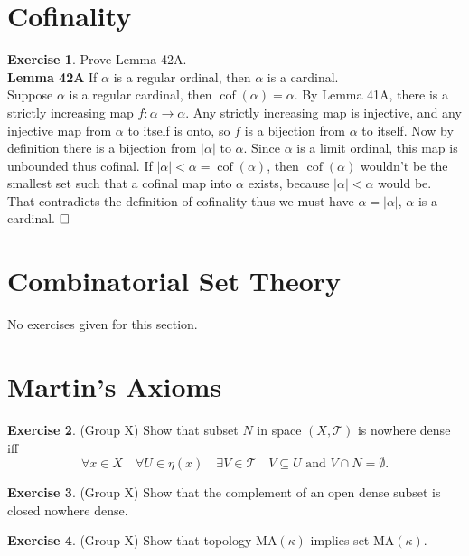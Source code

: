 \documentclass{article}
\theoremstyle{definition}
\newtheorem{exercise}{Exercise}[section]
\newcommand{\so}{\text{\textbf{Solution: }}}
\newcommand{\es}{$\hfill \square$}
\begin{document}
\section{Cofinality}
    \begin{exercise}
        Prove Lemma 42A.\vspace{1em}\\
        \textbf{Lemma 42A} If $\alpha$ is a regular ordinal, then $\alpha$ is a cardinal.\vspace{1em}\\
        \so Suppose $\alpha$ is a regular cardinal, then $\operatorname{cof}(\alpha) = \alpha$. By Lemma 41A, there is a strictly increasing map $f: \alpha \rightarrow \alpha$. Any strictly increasing map is injective, and any injective map from $\alpha$ to itself is onto, so $f$ is a bijection from $\alpha$ to itself. Now by definition there is a bijection from $|\alpha|$ to $\alpha$. Since $\alpha$ is a limit ordinal, this map is unbounded thus cofinal. If $|\alpha| < \alpha = \operatorname{cof}(\alpha)$, then $\operatorname{cof}(\alpha)$ wouldn't be the smallest set such that a cofinal map into $\alpha$ exists, because $|\alpha| < \alpha$ would be. That contradicts the definition of cofinality thus we must have $
        \alpha = |\alpha|$, $\alpha$ is a cardinal. \es
    \end{exercise}
\section{Combinatorial Set Theory}
No exercises given for this section.
\section{Martin’s Axioms}
    \begin{exercise}
        (Group X) Show that subset \(N\) in space \((X, \mathcal{T})\) is nowhere dense iff
        \[
        \forall x \in X \quad \forall U \in \eta(x) \quad \exists V \in \mathcal{T} \quad V \subseteq U \text{ and } V \cap N = \emptyset.
        \]
    \end{exercise}
    
    \begin{exercise}
        (Group X) Show that the complement of an open dense subset is closed nowhere dense.
    \end{exercise}
    
    \begin{exercise}
       (Group X) Show that topology \( \text{MA}(\kappa) \) implies set \( \text{MA}(\kappa) \).
    \end{exercise}
\end{document}
